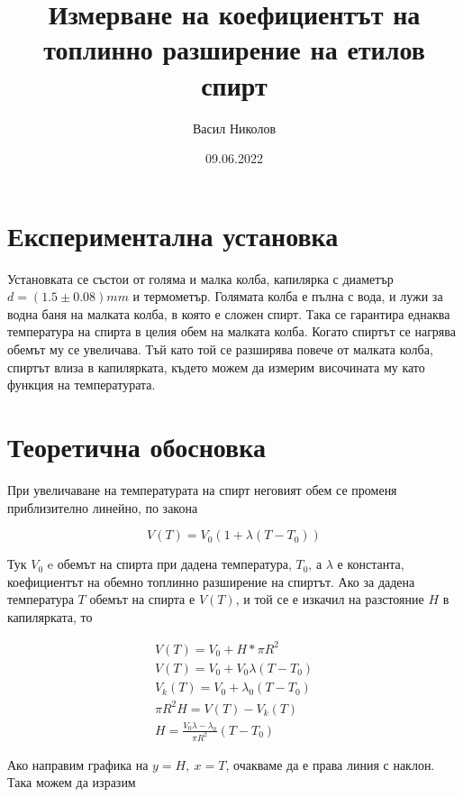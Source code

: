 \documentclass[%
 reprint,
 amsmath,amssymb,
 aps,
]{revtex4-2}
\begin{document}

\title{Измерване на коефициентът на топлинно разширение на етилов спирт}
\author{Васил Николов}
\date{09.06.2022}
\maketitle
\section{Експериментална установка}

Установката се състои от голяма и малка колба, капилярка с диаметър $d = (1.5 \pm 0.08) \si{mm}$ и термометър. Голямата колба е пълна с вода, и лужи за водна баня на малката колба, в която е сложен спирт. Така се гарантира еднаква температура на спирта в целия обем на малката колба. Когато спиртът се нагрява обемът му се увеличава. Тъй като той се разширява повече от малката колба, спиртът влиза в капилярката, където можем да измерим височината му като функция на температурата.

\section{Теоретична обосновка}

При увеличаване на температурата на спирт неговият обем се променя приблизително линейно, по закона 

\begin{equation*}
    V(T) = V_0 (1 + \lambda (T - T_0))
\end{equation*}

Тук $V_0$ e обемът на спирта при дадена температура, $T_0$, а $\lambda$ е константа, коефициентът на обемно топлинно разширение на спиртът. Ако за дадена температура $T$ обемът на спирта е $V(T)$, и той се е изкачил на разстояние $H$ в капилярката, то 

\begin{gather*}
    V(T) = V_0 + H*\pi R^2 \\
    V(T) = V_0 + V_0 \lambda (T - T_0) \\
    V_k(T) = V_0 + \lambda_0 (T - T_0) \\
    \pi R^2 H = V(T) - V_k(T) \\ 
    H = \frac{V_0 \lambda - \lambda_0}{\pi R^2} (T - T_0)
\end{gather*}

Ако направим графика на $y = H, \ x = T$, очакваме да е права линия с наклон. Така можем да изразим 
\end{document}
